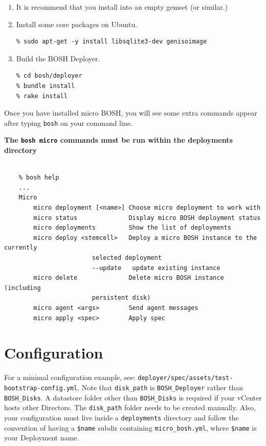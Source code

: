 \begin{enumerate}
\item It is recommend that you install into an empty gemset (or similar.)

\item Install some core packages on Ubuntu.

\begin{verbatim}
% sudo apt-get -y install libsqlite3-dev genisoimage
\end{verbatim}


\item Build the BOSH Deployer.

\begin{verbatim}
% cd bosh/deployer
% bundle install
% rake install
\end{verbatim}


\end{enumerate}

Once you have installed micro BOSH, you will see some extra commands appear after typing \texttt{bosh} on your command line. 

\textbf{The \texttt{bosh micro} commands must be run within the deployments directory}

\begin{adjustwidth}{2.5em}{2.5em}
\begin{verbatim}

    % bosh help
    ...
    Micro
        micro deployment [<name>] Choose micro deployment to work with
        micro status              Display micro BOSH deployment status
        micro deployments         Show the list of deployments
        micro deploy <stemcell>   Deploy a micro BOSH instance to the currently
                        selected deployment
                        --update   update existing instance
        micro delete              Delete micro BOSH instance (including
                        persistent disk)
        micro agent <args>        Send agent messages
        micro apply <spec>        Apply spec

\end{verbatim}
\end{adjustwidth}

\section{Configuration}
\label{configuration}

For a minimal configuration example, see: \texttt{deployer\slash spec\slash assets\slash test-bootstrap-config.yml}. Note that \texttt{disk\_path} is \texttt{BOSH\_Deployer} rather than \texttt{BOSH\_Disks}. A datastore folder other than \texttt{BOSH\_Disks} is required if your vCenter hosts other Directors. The \texttt{disk\_path} folder needs to be created manually. Also, your configuration must live inside a \texttt{deployments} directory and follow the convention of having a \texttt{\$name} subdir containing \texttt{micro\_bosh.yml}, where \texttt{\$name} is your Deployment name. 

